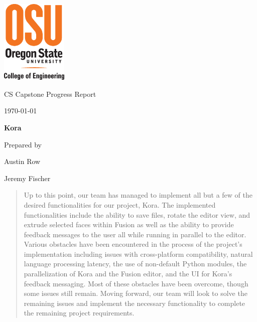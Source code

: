 \documentclass[onecolumn, draftclsnofoot,10pt, compsoc]{IEEEtran}
\def \CapstoneTeamName{\textbf{Insert Team Name Here} }
\def \CapstoneProjectName{Kora}
\def \DocType{		%
				Progress Report
				}
\begin{document}
\begin{titlepage}
    \begin{singlespace}
    	\includegraphics[height=4cm]{coe_v_spot1}
        \par\vspace{.2in}
        \centering
        \scshape{
            \huge CS Capstone \DocType \par
            {\large\today}\par
            \vspace{.5in}
            \textbf{\Huge\CapstoneProjectName}\par
            \vfill
            {\large Prepared by }\par
            \vspace{5pt}
            {\Large
                Austin Row\par
                Jeremy Fischer \par
            }
            \vspace{20pt}
        }
        \begin{abstract}
			Up to this point, our team has managed to implement all but a few of the desired functionalities for our project, Kora.
			The implemented functionalities include the ability to save files, rotate the editor view, and extrude selected faces within Fusion as well as the ability to provide feedback messages to the user all while running in parallel to the editor.
			Various obstacles have been encountered in the process of the project's implementation including issues with cross-platform compatibility, natural language processing latency, the use of non-default Python modules, the parallelization of Kora and the Fusion editor, and the UI for Kora's feedback messaging.
			Most of these obstacles have been overcome, though some issues still remain.
			Moving forward, our team will look to solve the remaining issues and implement the necessary functionality to complete the remaining project requirements.
        \end{abstract}     
    \end{singlespace}
\end{titlepage}
\newpage
{}
\tableofcontents
\clearpage
\end{document}
